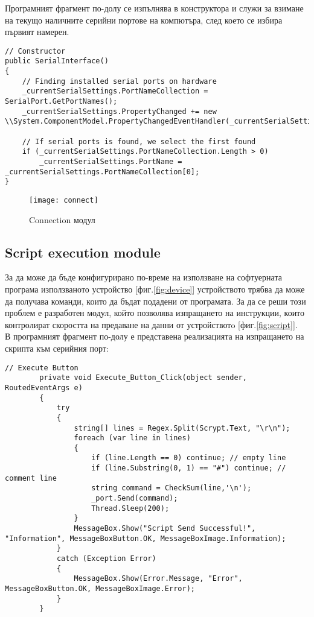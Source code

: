 Програмният фрагмент по-долу се изпълнява в конструктора и служи за взимане на текущо наличните серийни портове на компютъра, след което се избира първият намерен.
\begin{lstlisting}
// Constructor
public SerialInterface()
{
    // Finding installed serial ports on hardware
    _currentSerialSettings.PortNameCollection = SerialPort.GetPortNames();
    _currentSerialSettings.PropertyChanged += new \\System.ComponentModel.PropertyChangedEventHandler(_currentSerialSettings_PropertyChanged);

    // If serial ports is found, we select the first found
    if (_currentSerialSettings.PortNameCollection.Length > 0)
        _currentSerialSettings.PortName = _currentSerialSettings.PortNameCollection[0];
}
\end{lstlisting}



\begin{figure}
    \centerline{\texttt{[image: connect]}}
    \caption{Connection модул}
    \label{fig:connection}
\end{figure}

\subsection{Script execution module}
За да може да бъде конфигурирано по-време на използване на софтуерната програма използваното устройство [фиг.\ref{fig:device}] устройството трябва да може да получава команди, които да бъдат подадени от програмата. За да се реши този проблем е разработен модул, който позволява изпращането на инструкции, които контролират скоростта на предаване на данни от устройствотo [фиг.\ref{fig:script}].
\\
В програмният фрагмент по-долу е представена реализацията на изпращането на скрипта към серийния порт:
\begin{lstlisting}
// Execute Button
        private void Execute_Button_Click(object sender, RoutedEventArgs e)
        {
            try
            {
                string[] lines = Regex.Split(Scrypt.Text, "\r\n");
                foreach (var line in lines)
                {                    
                    if (line.Length == 0) continue; // empty line                    
                    if (line.Substring(0, 1) == "#") continue; // comment line
                    string command = CheckSum(line,'\n');
                    _port.Send(command); 
                    Thread.Sleep(200); 
                }
                MessageBox.Show("Script Send Successful!", "Information", MessageBoxButton.OK, MessageBoxImage.Information);
            }
            catch (Exception Error)
            {
                MessageBox.Show(Error.Message, "Error", MessageBoxButton.OK, MessageBoxImage.Error);
            }
        }
\end{lstlisting}




